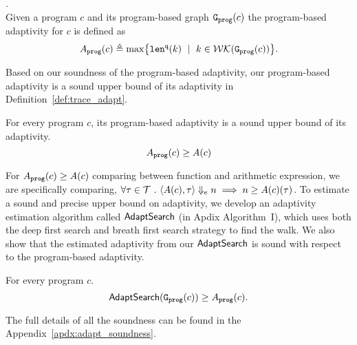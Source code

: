 %
%
%
\begin{defn}
.
\label{def:prog_adapt}
\\
{
Given a program ${c}$ and its program-based graph 
$\mathtt{{G_{prog}}}({c})$
%
the program-based adaptivity for $c$ is 
defined as%
\[
\progA({c})
\triangleq \max
\left\{ \qlen(k) \ \mid \  k \in \walks(\progG(c))\right \}.
\]
}
\end{defn}
Based on our soundness of the program-based adaptivity, our program-based adaptivity is a sound upper bound of its adaptivity in Definition~\ref{def:trace_adapt}. 
\begin{thm}
    \label{thm:sound_progadapt}
    For every program $c$, 
    its program-based adaptivity is a sound upper bound of its adaptivity.
     $$  A_{\mathtt{prog}}(c) \geq A(c)$$
\end{thm}
For $A_{\mathtt{prog}}(c) \geq A(c)$ comparing between function and arithmetic expression,
we are specifically comparing, $\forall \mathtt{\tau} \in \mathcal{T} ~.~
\langle A(c), \mathtt{\tau} \rangle \Downarrow_e n \implies n \geq A(c)(\mathtt{\tau}) $.
To estimate a sound and precise upper bound on adaptivity, we develop an adaptivity estimation algorithm called $\mathsf{AdaptSearch}$ (in Apdix Algorithm~I), which uses both the deep first search and breath first search strategy to find the walk. We also show that the estimated adaptivity from our $\mathsf{AdaptSearch}$ is sound with respect to the program-based adaptivity. 
\begin{thm}
    \label{thm:sound_adaptalg}
    For every program $c$.
     $$\mathsf{AdaptSearch}(\mathtt{{G_{prog}}}({c})) \geq A_{\mathtt{prog}}(c).$$
\end{thm}
The full details of all the soundness can be found in the Appendix~\ref{apdx:adapt_soundness}.


